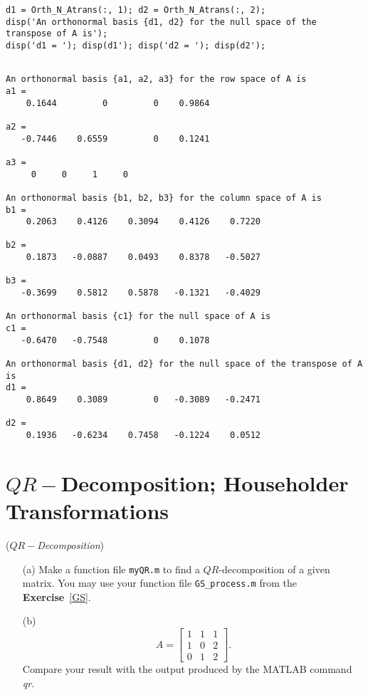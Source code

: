 \begin{sol}
\begin{verbatim}
d1 = Orth_N_Atrans(:, 1); d2 = Orth_N_Atrans(:, 2);
disp('An orthonormal basis {d1, d2} for the null space of the transpose of A is');
disp('d1 = '); disp(d1'); disp('d2 = '); disp(d2');
\end{verbatim}

\begin{outputs}
\begin{verbatim}

An orthonormal basis {a1, a2, a3} for the row space of A is
a1 =
    0.1644         0         0    0.9864

a2 =
   -0.7446    0.6559         0    0.1241

a3 =
     0     0     1     0

An orthonormal basis {b1, b2, b3} for the column space of A is
b1 =
    0.2063    0.4126    0.3094    0.4126    0.7220

b2 =
    0.1873   -0.0887    0.0493    0.8378   -0.5027

b3 =
   -0.3699    0.5812    0.5878   -0.1321   -0.4029

An orthonormal basis {c1} for the null space of A is
c1 =
   -0.6470   -0.7548         0    0.1078

An orthonormal basis {d1, d2} for the null space of the transpose of A is
d1 =
    0.8649    0.3089         0   -0.3089   -0.2471

d2 =
    0.1936   -0.6234    0.7458   -0.1224    0.0512
\end{verbatim}
\end{outputs}

\end{sol}








\section{$QR-$Decomposition; Householder Transformations}


\begin{exer}(\textit{$QR-$Decomposition})\\
\begin{enumerate}
\item[(a)] Make a function file \verb"myQR.m" to find a $QR$-decomposition of a given matrix. 
You may use your function file \verb"GS_process.m" from the \textbf{Exercise}~\ref{GS}.
\vspace{1mm}
\item[(b)] $$A=\begin{bmatrix} 1 & 1 & 1\\ 1& 0 & 2\\ 0 & 1& 2\end{bmatrix}.$$
Compare your result with the output produced by the MATLAB command \textit{qr}. 
\end{enumerate}
\end{exer}


